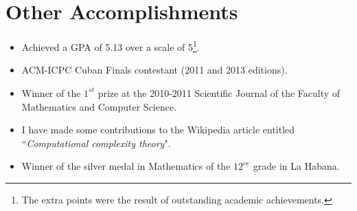 \documentclass[]{friggeri-cv}
\begin{document}
\section{Other Accomplishments}
\begin{itemize}[noitemsep, nolistsep]

	\item Achieved a GPA of 5.13 over a scale of 5\footnote{The extra points were the result of outstanding academic achievements.}.\\

	\item ACM-ICPC Cuban Finals contestant (2011 and 2013 editions).\\

	\item Winner of the $1^{st}$ prize at the 2010-2011 Scientific Journal of the Faculty of Mathematics and Computer Science.\\
	
	\item I have made some contributions to the Wikipedia article entitled ``\emph{Computational complexity theory}".\\
		
	\item Winner of the silver medal in Mathematics of the $12^{ve}$ grade in La Habana.\\
	
	
	
	
\end{itemize}
\end{document}
